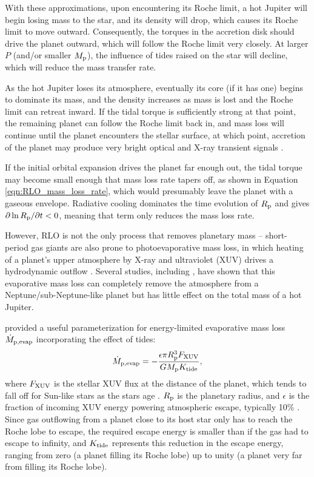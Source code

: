 \documentclass{svjour3}                     %
\begin{document}
With these approximations, upon encountering its Roche limit, a hot Jupiter will begin losing mass to the star, and its density will drop, which causes its Roche limit to move outward. Consequently, the torques in the accretion disk should drive the planet outward, which will follow the Roche limit very closely. At larger $P$ (and/or smaller $M_{\rm p}$), the influence of tides raised on the star will decline, which will reduce the mass transfer rate. 

As the hot Jupiter loses its atmosphere, eventually its core (if it has one) begins to dominate its mass, and the density increases as mass is lost and the Roche limit can retreat inward. If the tidal torque is sufficiently strong at that point, the remaining planet can follow the Roche limit back in, and mass loss will continue until the planet encounters the stellar surface, at which point, accretion of the planet may produce very bright optical and X-ray transient signals \cite{2012MNRAS.425.2778M}. 

If the initial orbital expansion drives the planet far enough out, the tidal torque may become small enough that mass loss rate tapers off, as shown in Equation \ref{eqn:RLO_mass_loss_rate}, which would presumably leave the planet with a gaseous envelope. Radiative cooling dominates the time evolution of $R_{\rm p}$ and gives $\partial \ln R_{\rm p}/\partial t < 0$, meaning that term only reduces the mass loss rate.

However, RLO is not the only process that removes planetary mass -- short-period gas giants are also prone to photoevaporative mass loss, in which heating of a planet's upper atmosphere by X-ray and ultraviolet (XUV) drives a hydrodynamic outflow  \cite{VidalMadjar2003Extended}. Several studies, including \cite{Lopez2013Role}, have shown that this evaporative mass loss can completely remove the atmosphere from a Neptune/sub-Neptune-like planet but has little effect on the total mass of a hot Jupiter. 

\cite{Erkaev2007Roche} provided a useful parameterization for energy-limited evaporative mass loss $\dot{M}_{\rm p, evap}$ incorporating the effect of tides:
\begin{equation}
\dot{M}_{\rm p, evap} = -\frac{\epsilon \pi R_{\rm p}^3 F_{\rm XUV}}{G M_{\rm p} K_{\rm tide}},
\label{eqn:evaporative_mass_loss}
\end{equation}
where $F_{\rm XUV}$ is the stellar XUV flux at the distance of the planet, which tends to fall off for Sun-like stars as the stars age \cite{Ribas2005Evolution}. $R_{\rm p}$ is the planetary radius, and $\epsilon$ is the fraction of incoming XUV energy powering atmospheric escape, typically 10\% \cite{Owen2012Planetary}. Since gas outflowing from a planet close to its host star only has to reach the Roche lobe to escape, the required escape energy is smaller than if the gas had to escape to infinity, and $K_{\rm tide}$ represents this reduction in the escape energy, ranging from zero (a planet filling its Roche lobe) up to unity (a planet very far from filling its Roche lobe). 
\end{document}
